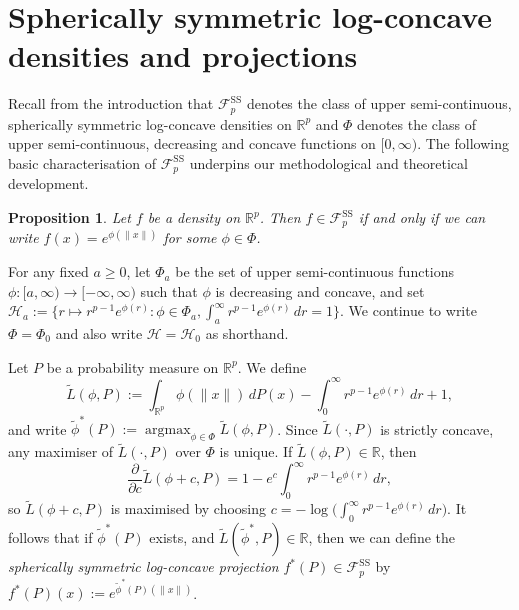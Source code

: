 \documentclass[a4paper,12pt]{article}
\newtheorem{proposition}[theorem]{Proposition}
\DeclareMathOperator*{\argmax}{argmax}
\newenvironment{definition}[1][Definition:]{\begin{trivlist}
\item[\hskip \labelsep {\bfseries #1}]}{\end{trivlist}}
\newenvironment{remark}[1][Remark:]{\begin{trivlist}
\item[\hskip \labelsep {\bfseries #1}]}{\end{trivlist}}
\begin{document}
\section{Spherically symmetric log-concave densities and projections}
\label{Sec:SSLCProjections}


Recall from the introduction that $\mathcal{F}_p^{\mathrm{SS}}$ denotes the class of upper semi-continuous, spherically symmetric log-concave densities on $\mathbb{R}^p$ and $\Phi$ denotes the class of upper semi-continuous, decreasing and concave functions on $[0,\infty)$.  The following basic characterisation of $\mathcal{F}_p^{\mathrm{SS}}$ underpins our methodological and theoretical development.
\begin{proposition}
\label{Prop:SSLC}
Let $f$ be a density on $\mathbb{R}^p$.  Then $f \in \mathcal{F}_p^{\mathrm{SS}}$ if and only if we can write $f(x) = e^{\phi(\|x\|)}$ for some $\phi \in \Phi$.
\end{proposition}


For any fixed $a \geq 0$, let $\Phi_{a}$ be the set of upper semi-continuous functions $\phi : [a, \infty) \rightarrow [-\infty, \infty)$ such that $\phi$ is decreasing and concave, and set $\mathcal{H}_{a} := \bigl\{r \mapsto r^{p-1}e^{\phi(r)} : \phi \in \Phi_{a}, \int_{a}^\infty r^{p-1}e^{\phi(r)} \, dr = 1\bigr\}$.  We continue to write $\Phi = \Phi_0$ and also write $\mathcal{H} = \mathcal{H}_0$ as shorthand.

Let $P$ be a probability measure on $\mathbb{R}^p$. We define
\begin{equation}
  \label{Eq:RpProjection}
\tilde{L}(\phi, P) := \int_{\mathbb{R}^p} \phi(\| x \|) \, dP(x) - \int_0^{\infty} r^{p-1} e^{\phi(r)} \, dr + 1,
\end{equation}
and write $\tilde{\phi}^*(P) := \argmax_{\phi \in \Phi} \tilde{L}(\phi,P)$.  Since $\tilde{L}(\cdot,P)$ is strictly concave, any maximiser of $\tilde{L}(\cdot,P)$ over $\Phi$ is unique.
If $\tilde{L}(\phi,P) \in \mathbb{R}$, then %
\[
\frac{\partial}{\partial c} \tilde{L}(\phi + c, P) = 1 - e^c \int_0^\infty r^{p-1}e^{\phi(r)} \, dr,
\]
so $\tilde{L}(\phi + c, P)$ is maximised by choosing $c = -\log \bigl(\int_0^\infty r^{p-1}e^{\phi(r)} \, dr\bigr)$.  It follows that if $\tilde{\phi}^*(P)$ exists, and $\tilde{L}(\tilde{\phi}^*,P) \in \mathbb{R}$, then we can define the \emph{spherically symmetric log-concave projection} $f^*(P) \in \mathcal{F}_p^{\mathrm{SS}}$ by $f^*(P)(x) := e^{\tilde{\phi}^*(P)(\|x\|)}$.  
\end{document}
